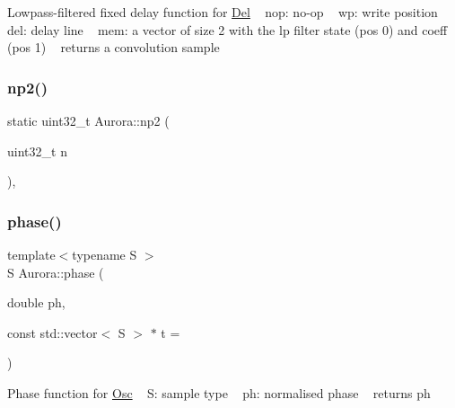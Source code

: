 Lowpass-\/filtered fixed delay function for \hyperlink{class_aurora_1_1_del}{Del} ~\newline
 nop\+: no-\/op ~\newline
 wp\+: write position ~\newline
 del\+: delay line ~\newline
 mem\+: a vector of size 2 with the lp filter state (pos 0) and coeff (pos 1) ~\newline
 returns a convolution sample \mbox{\label{namespace_aurora_a49b6f6d92479d80271ced42627154066}} 
\subsubsection{\texorpdfstring{np2()}{np2()}}
{\footnotesize\ttfamily static uint32\+\_\+t Aurora\+::np2 (\begin{DoxyParamCaption}\item[{uint32\+\_\+t}]{n }\end{DoxyParamCaption})\hspace{0.3cm}{\ttfamily [inline]}, {\ttfamily [static]}}

\mbox{\label{namespace_aurora_a6a6af5d9695d0ec8fcb343c456c1faab}} 
\subsubsection{\texorpdfstring{phase()}{phase()}}
{\footnotesize\ttfamily template$<$typename S $>$ \\
S Aurora\+::phase (\begin{DoxyParamCaption}\item[{double}]{ph,  }\item[{const std\+::vector$<$ S $>$ $\ast$}]{t = {} }\end{DoxyParamCaption})\hspace{0.3cm}{\ttfamily [inline]}}

Phase function for \hyperlink{class_aurora_1_1_osc}{Osc} ~\newline
S\+: sample type ~\newline
ph\+: normalised phase ~\newline
returns ph \mbox{\label{namespace_aurora_a5f8647080e611bbb89c4778a9e02e063}} 
